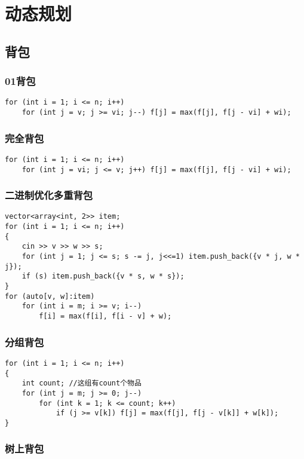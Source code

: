 \documentclass[a4paper, fontset=none]{ctexart}
\begin{document}
\section{动态规划}
\subsection{背包}
\subsubsection{01背包}

\begin{verbatim}
for (int i = 1; i <= n; i++)
    for (int j = v; j >= vi; j--) f[j] = max(f[j], f[j - vi] + wi);
\end{verbatim}
\subsubsection{完全背包}

\begin{verbatim}
for (int i = 1; i <= n; i++)
    for (int j = vi; j <= v; j++) f[j] = max(f[j], f[j - vi] + wi);
\end{verbatim}

\subsubsection{二进制优化多重背包}

\begin{verbatim}
vector<array<int, 2>> item;
for (int i = 1; i <= n; i++)
{
    cin >> v >> w >> s;
    for (int j = 1; j <= s; s -= j, j<<=1) item.push_back({v * j, w * j});
    if (s) item.push_back({v * s, w * s});
}
for (auto[v, w]:item)
    for (int i = m; i >= v; i--)
        f[i] = max(f[i], f[i - v] + w);
\end{verbatim}
\subsubsection{分组背包}

\begin{verbatim}
for (int i = 1; i <= n; i++)
{
    int count; //这组有count个物品
    for (int j = m; j >= 0; j--)
        for (int k = 1; k <= count; k++)
            if (j >= v[k]) f[j] = max(f[j], f[j - v[k]] + w[k]);
}
\end{verbatim}
\subsubsection{树上背包}
\end{document}
